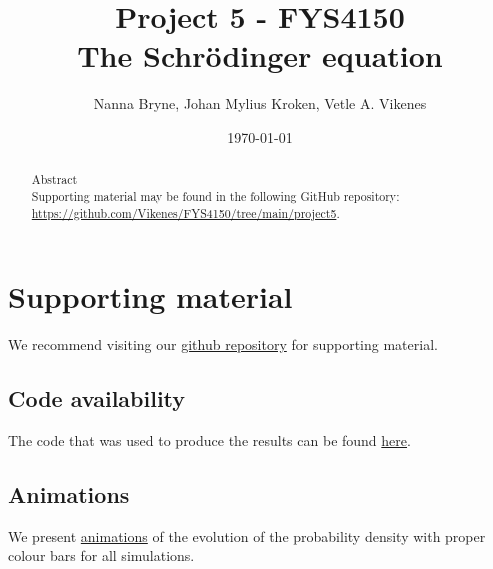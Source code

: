 



\title{Project 5 - FYS4150 \\
The Schrödinger equation
} 
\author{Nanna Bryne, Johan Mylius Kroken, Vetle A. Vikenes} 
\date{\today}                             
\noaffiliation                            

\begin{abstract}
    Abstract\\
    Supporting material may be found in the following GitHub repository: \url{https://github.com/Vikenes/FYS4150/tree/main/project5}.
\end{abstract}
\maketitle



















\section*{Supporting material}

We recommend visiting our \href{https://github.com/Vikenes/FYS4150/tree/main/project5}{github repository} for supporting material.

\subsection*{Code availability}
The code that was used to produce the results can be found \href{https://github.com/Vikenes/FYS4150/tree/main/project5/code}{here}.

\subsection*{Animations}
We present \href{https://github.com/Vikenes/FYS4150/tree/main/project5/output/videos}{animations} of the evolution of the probability density with proper colour bars for all simulations. 


\newpage


\newpage


 


